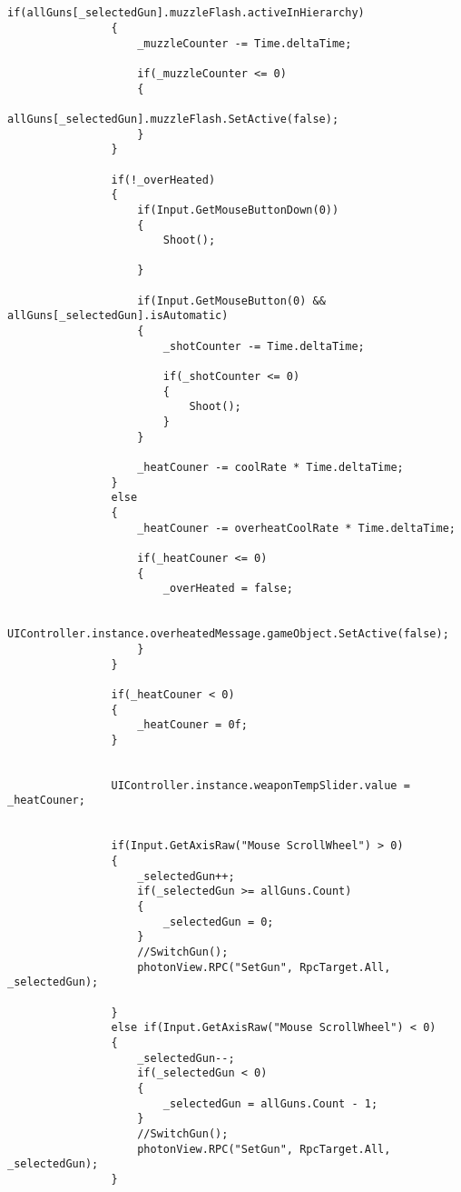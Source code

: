 \begin{enumerate}
\begin{lstlisting}
    
                if(allGuns[_selectedGun].muzzleFlash.activeInHierarchy)
                {
                    _muzzleCounter -= Time.deltaTime;
    
                    if(_muzzleCounter <= 0)
                    {
                        allGuns[_selectedGun].muzzleFlash.SetActive(false);
                    }
                }
    
                if(!_overHeated)
                {
                    if(Input.GetMouseButtonDown(0))
                    {
                        Shoot();
    
                    }
    
                    if(Input.GetMouseButton(0) && allGuns[_selectedGun].isAutomatic)
                    {
                        _shotCounter -= Time.deltaTime;
    
                        if(_shotCounter <= 0)
                        {
                            Shoot();
                        }
                    }
    
                    _heatCouner -= coolRate * Time.deltaTime;
                }
                else
                {
                    _heatCouner -= overheatCoolRate * Time.deltaTime;
    
                    if(_heatCouner <= 0)
                    {
                        _overHeated = false;
    
                        UIController.instance.overheatedMessage.gameObject.SetActive(false);
                    }
                }
    
                if(_heatCouner < 0)
                {
                    _heatCouner = 0f;
                }
    
    
                UIController.instance.weaponTempSlider.value = _heatCouner;
    
    
                if(Input.GetAxisRaw("Mouse ScrollWheel") > 0)
                {
                    _selectedGun++;
                    if(_selectedGun >= allGuns.Count)
                    {
                        _selectedGun = 0;
                    }
                    //SwitchGun();
                    photonView.RPC("SetGun", RpcTarget.All, _selectedGun);
    
                } 
                else if(Input.GetAxisRaw("Mouse ScrollWheel") < 0)
                {
                    _selectedGun--;
                    if(_selectedGun < 0)
                    {
                        _selectedGun = allGuns.Count - 1;
                    }
                    //SwitchGun();
                    photonView.RPC("SetGun", RpcTarget.All, _selectedGun);
                }
    

\end{lstlisting}
\end{enumerate}
